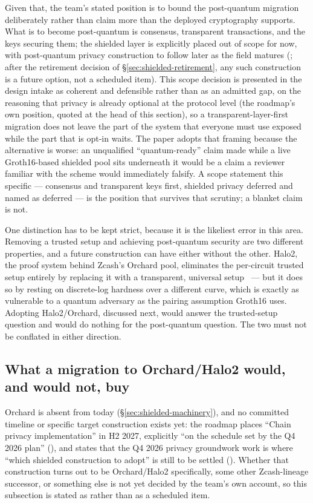 Given that, the team's stated position is to bound the post-quantum migration deliberately rather
than claim more than the deployed cryptography supports. What is to become post-quantum is
consensus, transparent transactions, and the keys securing them; the shielded layer is explicitly
placed out of scope for now, with post-quantum privacy construction to follow later as the field
matures  (\vision; after the retirement decision of
\S\ref{sec:shielded-retirement}, any such construction is a future option, not a scheduled item).
This scope decision is presented in the design intake
as coherent and defensible rather than as an admitted gap, on the reasoning that privacy is already
optional at the protocol level (the roadmap's own position, quoted at the head of this section), so a
transparent-layer-first migration does not leave the
part of the system that everyone must use exposed while the part that is opt-in waits. The paper
adopts that framing because the alternative is worse: an unqualified ``quantum-ready'' claim made
while a live Groth16-based shielded pool sits underneath it would be a claim a reviewer familiar with
the scheme would immediately falsify. A scope statement this specific — consensus and transparent
keys first, shielded privacy deferred and named as deferred — is the position that survives that
scrutiny; a blanket claim is not.

One distinction has to be kept strict, because it is the likeliest error in this area. Removing a
trusted setup and achieving post-quantum security are two different properties, and a future
construction can have either without the other. Halo2, the proof system behind Zcash's Orchard
pool, eliminates the per-circuit trusted setup entirely by replacing it with a transparent, universal
setup~\citep{bowe2019halo} — but it does so by resting on discrete-log hardness over a different
curve, which is exactly as vulnerable to a quantum adversary as the pairing assumption Groth16 uses.
Adopting Halo2/Orchard, discussed next, would answer the trusted-setup question and would do nothing
for the post-quantum question. The two must not be conflated in either direction.

\subsection{What a migration to Orchard/Halo2 would, and would not, buy}
\label{sec:orchard-migration}

Orchard is absent from \fluxd today (\S\ref{sec:shielded-machinery}), and no committed timeline or
specific target construction exists yet: the roadmap places ``Chain privacy implementation'' in H2
2027, explicitly ``on the schedule set by the Q4 2026 plan''
 (\planned), and states that the Q4 2026 privacy groundwork
work is where ``which shielded construction to adopt'' is still to be settled
 (\planned). Whether that construction turns out to be
Orchard/Halo2 specifically, some other Zcash-lineage successor, or something else is not yet decided
by the team's own account, so this subsection is stated as \vision rather than as a scheduled item.


